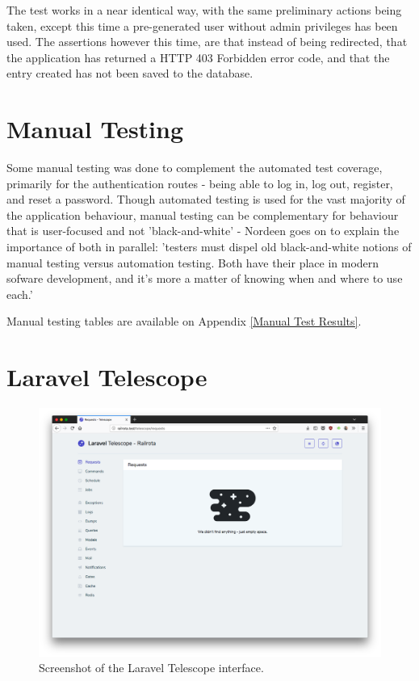 The test works in a near identical way, with the same preliminary actions being taken, except this time a pre-generated user without admin privileges has been used. The assertions however this time, are that instead of being redirected, that the application has returned a HTTP 403 Forbidden error code, and that the entry created has not been saved to the database.

\section{Manual Testing}
Some manual testing was done to complement the automated test coverage, primarily for the authentication routes - being able to log in, log out, register, and reset a password. Though automated testing is used for the vast majority of the application behaviour, manual testing can be complementary for behaviour that is user-focused and not 'black-and-white' - Nordeen goes on to explain the importance of both in parallel: 'testers must dispel old black-and-white notions of manual testing versus automation testing. Both have their place in modern sofware development, and it's more a matter of knowing when and where to use each.' \cite{Nordeen1}

Manual testing tables are available on Appendix \ref{Manual Test Results}.

\section{Laravel Telescope}

\begin{figure}[!ht]
    \centering
    \includegraphics[width=1.0\textwidth]{Figures/screenshot-telescope}
    \caption{Screenshot of the Laravel Telescope interface.}
    \label{fig:telescope}
\end{figure}

